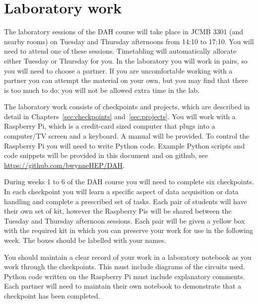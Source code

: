 \newpage
\section{Laboratory work}

The laboratory sessions of the DAH course will take place in JCMB 3301 (and nearby rooms) on Tuesday and Thursday afternoons from 14:10 to 17:10.
You will need to attend one of these sessions.
Timetabling will automatically allocate either Tuesday or Thursday for you.
In the laboratory you will work in pairs, so you will need to choose a partner.
If you are uncomfortable working with a partner you can attempt the material on your own, but you may find that there is too much to do: you will not be allowed extra time in the lab.

The laboratory work consists of checkpoints and projects, which are described in detail in Chapters~\ref{sec:checkpoints} and~\ref{sec:projects}.
You will work with a Raspberry Pi, which is a credit-card sized computer that plugs into a computer/TV screen and a keyboard.
A manual will be provided.
To control the Raspberry Pi you will need to write Python code.
Example Python scripts and code snippets will be provided in this document and on github, see \url{https://github.com/bwynneHEP/DAH}. 

During weeks 1 to 6 of the DAH course you will need to complete six checkpoints.
In each checkpoint you will learn a specific aspect of data acquisition or data handling and complete a prescribed set of tasks.
Each pair of students will have their own set of kit, however the Raspberry Pis will be shared between the Tuesday and Thursday afternoon sessions.
Each pair will be given a yellow box with the required kit in which you can preserve your work for use in the following week.
The boxes should be labelled with your names.

You should maintain a clear record of your work in a laboratory notebook as you work through the checkpoints.
This must include diagrams of the circuits used.
Python code written on the Raspberry Pi must include explanatory comments. %
Each partner will need to maintain their own notebook to demonstrate that a checkpoint has been completed.

